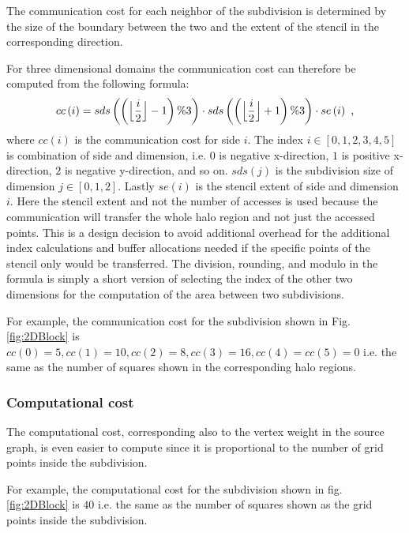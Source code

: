 The communication cost for each neighbor of the subdivision is determined by the size of the boundary between the two and the extent of the stencil in the corresponding direction.

For three dimensional domains the communication cost can therefore be computed from the following formula:
\begin{equation}
cc\left(i\right) = sds\left(\left(\floor[\Big]{\frac{i}{2}} - 1\right) \% 3 \right) \cdot sds\left(\left(\floor[\Big]{\frac{i}{2}} + 1\right) \% 3 \right) \cdot se\left(i\right) \text{ ,}
\end{equation}
where $cc\left(i\right)$ is the communication cost for side $i$.
The index $i \in \left[0, 1, 2, 3, 4, 5\right]$ is combination of side and dimension, i.e. $0$ is negative x-direction, $1$ is positive x-direction, $2$ is negative y-direction, and so on.
$sds\left(j\right)$ is the subdivision size of dimension $j \in \left[0,1,2\right]$.
Lastly $se\left(i\right)$ is the stencil extent of side and dimension $i$.
Here the stencil extent and not the number of accesses is used because the communication will transfer the whole halo region and not just the accessed points.
This is a design decision to avoid additional overhead for the additional index calculations and buffer allocations needed if the specific points of the stencil only would be transferred.
The division, rounding, and modulo in the formula is simply a short version of selecting the index of the other two dimensions for the computation of the area between two subdivisions.

For example, the communication cost for the subdivision shown in Fig. \ref{fig:2DBlock} is $cc\left(0\right) = 5, cc\left(1\right) = 10, cc\left(2\right) = 8, cc\left(3\right) = 16, cc\left(4\right) = cc\left(5\right) = 0$ i.e. the same as the number of squares shown in the corresponding halo regions.

\subsubsection{Computational cost}
\label{sec:compcost}
The computational cost, corresponding also to the vertex weight in the source graph, is even easier to compute since it is proportional to the number of grid points inside the subdivision.

For example, the computational cost for the subdivision shown in fig. \ref{fig:2DBlock} is $40$ i.e. the same as the number of squares shown as the grid points inside the subdivision.

